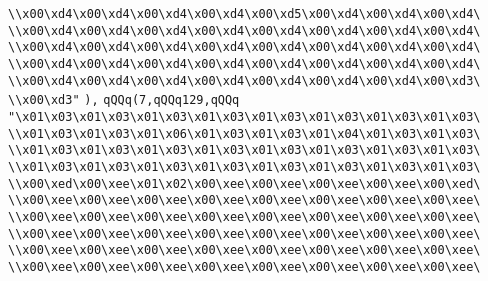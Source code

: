 \verb|\\x00\xd4\x00\xd4\x00\xd4\x00\xd4\x00\xd5\x00\xd4\x00\xd4\x00\xd4\|\newline
\verb|\\x00\xd4\x00\xd4\x00\xd4\x00\xd4\x00\xd4\x00\xd4\x00\xd4\x00\xd4\|\newline
\verb|\\x00\xd4\x00\xd4\x00\xd4\x00\xd4\x00\xd4\x00\xd4\x00\xd4\x00\xd4\|\newline
\verb|\\x00\xd4\x00\xd4\x00\xd4\x00\xd4\x00\xd4\x00\xd4\x00\xd4\x00\xd4\|\newline
\verb|\\x00\xd4\x00\xd4\x00\xd4\x00\xd4\x00\xd4\x00\xd4\x00\xd4\x00\xd3\|\newline
\verb|\\x00\xd3"|\newline
\verb|),|\newline
\verb|qQQq(7,qQQq129,qQQq|\newline
\verb|"\x01\x03\x01\x03\x01\x03\x01\x03\x01\x03\x01\x03\x01\x03\x01\x03\|\newline
\verb|\\x01\x03\x01\x03\x01\x06\x01\x03\x01\x03\x01\x04\x01\x03\x01\x03\|\newline
\verb|\\x01\x03\x01\x03\x01\x03\x01\x03\x01\x03\x01\x03\x01\x03\x01\x03\|\newline
\verb|\\x01\x03\x01\x03\x01\x03\x01\x03\x01\x03\x01\x03\x01\x03\x01\x03\|\newline
\verb|\\x00\xed\x00\xee\x01\x02\x00\xee\x00\xee\x00\xee\x00\xee\x00\xed\|\newline
\verb|\\x00\xee\x00\xee\x00\xee\x00\xee\x00\xee\x00\xee\x00\xee\x00\xee\|\newline
\verb|\\x00\xee\x00\xee\x00\xee\x00\xee\x00\xee\x00\xee\x00\xee\x00\xee\|\newline
\verb|\\x00\xee\x00\xee\x00\xee\x00\xee\x00\xee\x00\xee\x00\xee\x00\xee\|\newline
\verb|\\x00\xee\x00\xee\x00\xee\x00\xee\x00\xee\x00\xee\x00\xee\x00\xee\|\newline
\verb|\\x00\xee\x00\xee\x00\xee\x00\xee\x00\xee\x00\xee\x00\xee\x00\xee\|\newline
